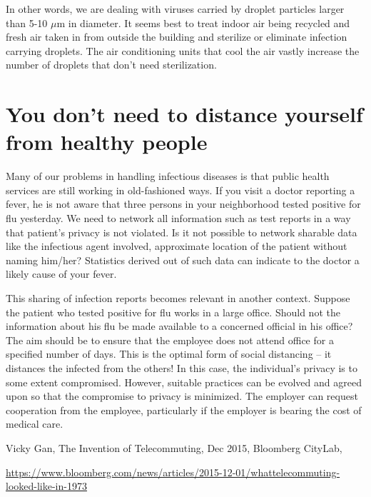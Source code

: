 \begin{multicols}{2}
In other words, we are dealing with viruses carried by droplet particles larger than 5-10 $\mu$m in diameter. It seems best to treat indoor air being recycled and fresh air taken in from outside the building and sterilize or eliminate infection carrying droplets. The air conditioning units that cool the air vastly increase the number of droplets that don’t need sterilization.

\vspace{-.4cm}

\section{You don’t need to distance yourself from healthy people}\label{section-6}

\vspace{-.2cm}

Many of our problems in handling infectious diseases is that public health services are still working in old-fashioned ways. If you visit a doctor reporting a fever, he is not aware that three persons in your neighborhood tested positive for flu yesterday. We need to network all information such as test reports in a way that patient’s privacy is not violated. Is it not possible to network sharable data like the infectious agent involved, approximate location of the patient without naming him/her? Statistics derived out of such data can indicate to the doctor a likely cause of your fever.

This sharing of infection reports becomes relevant in another context. Suppose the patient who tested positive for flu works in a large office. Should not the information about his flu be made available to a concerned official in his office? The aim should be to ensure that the employee does not attend office for a specified number of days. This is the optimal form of social distancing – it distances the infected from the others! In this case, the individual’s privacy is to some extent compromised. However, suitable practices can be evolved and agreed upon so that the compromise to privacy is minimized. The employer can request cooperation from the employee, particularly if the employer is bearing the cost of medical care.

\begin{thebibliography}{99}

 Vicky Gan, The Invention of Telecommuting, Dec 2015, Bloomberg CityLab,


\url{https://www.bloomberg.com/news/articles/2015-12-01/whattelecommuting-looked-like-in-1973}


\end{thebibliography}
\end{multicols}
